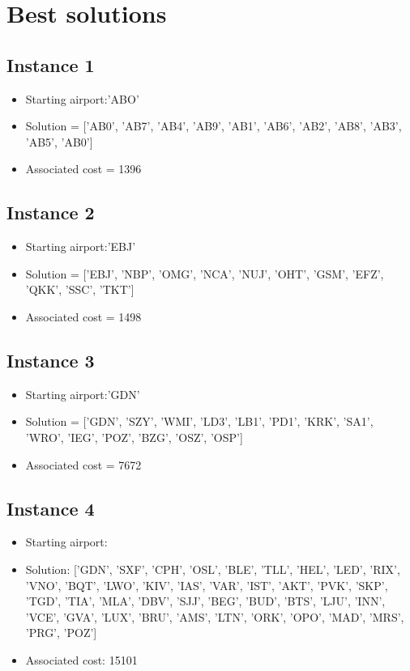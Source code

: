 \chapter{Best solutions}
\label{AppendixD}

\section*{Instance 1}
\begin{itemize}
    \item Starting airport:'ABO'
    \item Solution = ['AB0', 'AB7', 'AB4', 'AB9', 'AB1', 'AB6', 'AB2', 'AB8', 'AB3', 'AB5', 'AB0']
    \item Associated cost = 1396
\end{itemize}

\section*{Instance 2}
\begin{itemize}
    \item Starting airport:'EBJ'
    \item Solution = ['EBJ', 'NBP', 'OMG', 'NCA', 'NUJ', 'OHT', 'GSM', 'EFZ', 'QKK', 'SSC', 'TKT']
    \item Associated cost = 1498
\end{itemize}
\section*{Instance 3}
\begin{itemize}
    \item Starting airport:'GDN'
    \item Solution = ['GDN', 'SZY', 'WMI', 'LD3', 'LB1', 'PD1', 'KRK', 'SA1', 'WRO', 'IEG', 'POZ', 'BZG', 'OSZ', 'OSP']
    \item Associated cost = 7672
\end{itemize}

\section*{Instance 4}

\begin{itemize}
    \item Starting airport:
    \item Solution: ['GDN', 'SXF', 'CPH', 'OSL', 'BLE', 'TLL', 'HEL', 'LED', 'RIX', 'VNO', 'BQT', 'LWO', 'KIV', 'IAS', 'VAR', 'IST', 'AKT', 'PVK', 'SKP', 'TGD', 'TIA', 'MLA', 'DBV', 'SJJ', 'BEG', 'BUD', 'BTS', 'LJU', 'INN', 'VCE', 'GVA', 'LUX', 'BRU', 'AMS', 'LTN', 'ORK', 'OPO', 'MAD', 'MRS', 'PRG', 'POZ']
    \item Associated cost: 15101
\end{itemize}


